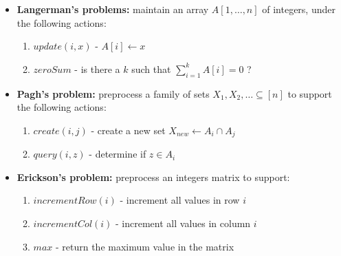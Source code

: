\documentclass[8pt]{beamer}
\begin{document}
{\begin{itemize}
      \item \textbf{Langerman's problems:} maintain an array $A[1,\dots,n]$ of integers, under the following actions:
	\begin{enumerate}
	  \item $update(i,x)$ - $A[i]\leftarrow x$
	  \item $zeroSum$ - is there a $k$ such that $\sum_{i=1}^{k}{A[i]}=0$ ?
	\end{enumerate}
      \item \textbf{Pagh's problem:} preprocess a family of sets $X_1,X_2,\dots\subseteq[n]$ to support the following actions:
	\begin{enumerate}
	  \item $create(i,j)$ - create a new set $X_{new}\leftarrow{A_i\cap{A_j}}$
	  \item $query(i,z)$ - determine if $z\in{A_i}$
	\end{enumerate}
      \item \textbf{Erickson's problem:} preprocess an integers matrix to support:
	\begin{enumerate}
	  \item $incrementRow(i)$ - increment all values in row $i$
	  \item $incrementCol(i)$ - increment all values in column $i$
	  \item $max$ - return the maximum value in the matrix
	\end{enumerate}
    \end{itemize}
  }
\end{document}
